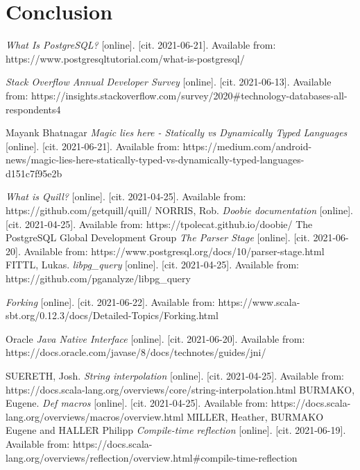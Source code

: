 \documentclass[thesis=B,english]{FITthesis}[2019/12/23]
\begin{document}
\chapter{Conclusion}




\begin{thebibliography}{9}

\textit {What Is PostgreSQL?} [online]. [cit. 2021-06-21]. Available from:
https://www.postgresqltutorial.com/what-is-postgresql/

\textit {Stack Overflow Annual Developer Survey} [online]. [cit. 2021-06-13]. Available from: https://insights.stackoverflow.com/survey/2020\#technology-databases-all-respondents4

Mayank Bhatnagar
\textit {Magic lies here - Statically vs Dynamically Typed Languages} [online]. [cit. 2021-06-21]. Available from: https://medium.com/android-news/magic-lies-here-statically-typed-vs-dynamically-typed-languages-d151c7f95e2b

\textit {What is Quill?} [online]. [cit. 2021-04-25]. Available from: https://github.com/getquill/quill/
NORRIS, Rob. 
\textit {Doobie documentation} [online]. [cit. 2021-04-25]. Available from: https://tpolecat.github.io/doobie/
The PostgreSQL Global Development Group
\textit{The Parser Stage} [online]. [cit. 2021-06-20]. Available from: https://www.postgresql.org/docs/10/parser-stage.html
FITTL, Lukas.
\textit {libpg\_query} [online]. [cit. 2021-04-25]. Available from:
https://github.com/pganalyze/libpg\_query

\textit {Forking} [online]. [cit. 2021-06-22]. Available from:
https://www.scala-sbt.org/0.12.3/docs/Detailed-Topics/Forking.html

Oracle
\textit{Java Native Interface} [online]. [cit. 2021-06-20]. Available from:
https://docs.oracle.com/javase/8/docs/technotes/guides/jni/

SUERETH, Josh. 
\textit {String interpolation} [online]. [cit. 2021-04-25]. Available from: https://docs.scala-lang.org/overviews/core/string-interpolation.html
BURMAKO, Eugene. 
\textit {Def macros} [online]. [cit. 2021-04-25]. Available from: https://docs.scala-lang.org/overviews/macros/overview.html
MILLER, Heather, BURMAKO Eugene and HALLER Philipp 
\textit {Compile-time reflection} [online]. [cit. 2021-06-19]. Available from: https://docs.scala-lang.org/overviews/reflection/overview.html\#compile-time-reflection

\end{thebibliography}
\appendix
\end{document}
